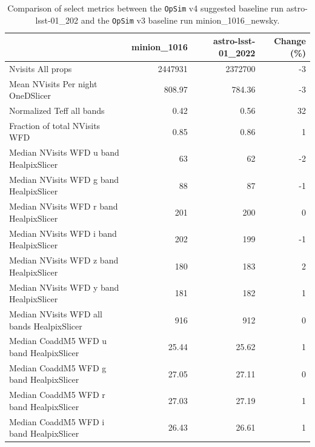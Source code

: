 \documentclass[DM,lsstdraft,authoryear,toc]{lsstdoc}
\newcommand{\opsim}{\texttt{OpSim}\xspace}
\begin{document}
\begin{table}
\caption{Comparison of select metrics between the \opsim v4 suggested baseline run \break astro-lsst-01\_202 and the \opsim v3 baseline run minion\_1016\_newsky.}
\small
\begin{tabular}{lrrr}
\toprule
{} &  minion\_1016 &  astro-lsst-01\_2022 &  Change (\%) \\
\midrule
Nvisits All props                                  &             2447931 &             2372700 &         -3 \\
Mean NVisits Per night OneDSlicer                  &              808.97 &              784.36 &         -3 \\
Normalized Teff all bands                          &                0.42 &                0.56 &         32 \\
Fraction of total NVisits WFD                      &                0.85 &                0.86 &          1 \\
Median NVisits WFD u band HealpixSlicer            &                  63 &                  62 &         -2 \\
Median NVisits WFD g band HealpixSlicer            &                  88 &                  87 &         -1 \\
Median NVisits WFD r band HealpixSlicer            &                 201 &                 200 &          0 \\
Median NVisits WFD i band HealpixSlicer            &                 202 &                 199 &         -1 \\
Median NVisits WFD z band HealpixSlicer            &                 180 &                 183 &          2 \\
Median NVisits WFD y band HealpixSlicer            &                 181 &                 182 &          1 \\
Median NVisits WFD all bands HealpixSlicer         &                 916 &                 912 &          0 \\
Median CoaddM5 WFD u band HealpixSlicer            &               25.44 &               25.62 &          1 \\
Median CoaddM5 WFD g band HealpixSlicer            &               27.05 &               27.11 &          0 \\
Median CoaddM5 WFD r band HealpixSlicer            &               27.03 &               27.19 &          1 \\
Median CoaddM5 WFD i band HealpixSlicer            &               26.43 &               26.61 &          1 \\

\end{tabular}
\end{table}
\end{document}
